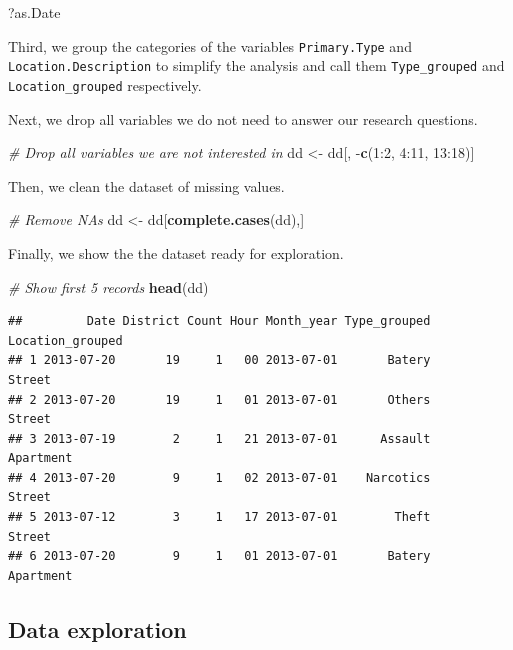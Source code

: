 \documentclass[]{article}
\newenvironment{Shaded}{\begin{snugshade}}{\end{snugshade}}
\newcommand{\KeywordTok}[1]{\textcolor[rgb]{0.13,0.29,0.53}{\textbf{{#1}}}}
\newcommand{\DecValTok}[1]{\textcolor[rgb]{0.00,0.00,0.81}{{#1}}}
\newcommand{\StringTok}[1]{\textcolor[rgb]{0.31,0.60,0.02}{{#1}}}
\newcommand{\CommentTok}[1]{\textcolor[rgb]{0.56,0.35,0.01}{\textit{{#1}}}}
\newcommand{\NormalTok}[1]{{#1}}
\begin{document}
?as.Date

Third, we group the categories of the variables \texttt{Primary.Type}
and \texttt{Location.Description} to simplify the analysis and call them
\texttt{Type\_grouped} and \texttt{Location\_grouped} respectively.

Next, we drop all variables we do not need to answer our research
questions.

\begin{Shaded}
\begin{Highlighting}[]
\CommentTok{# Drop all variables we are not interested in}
\NormalTok{dd <-}\StringTok{ }\NormalTok{dd[, -}\KeywordTok{c}\NormalTok{(}\DecValTok{1}\NormalTok{:}\DecValTok{2}\NormalTok{, }\DecValTok{4}\NormalTok{:}\DecValTok{11}\NormalTok{, }\DecValTok{13}\NormalTok{:}\DecValTok{18}\NormalTok{)]}
\end{Highlighting}
\end{Shaded}

Then, we clean the dataset of missing values.

\begin{Shaded}
\begin{Highlighting}[]
\CommentTok{# Remove NAs}
\NormalTok{dd <-}\StringTok{ }\NormalTok{dd[}\KeywordTok{complete.cases}\NormalTok{(dd),]}
\end{Highlighting}
\end{Shaded}

Finally, we show the the dataset ready for exploration.

\begin{Shaded}
\begin{Highlighting}[]
\CommentTok{# Show first 5 records}
\KeywordTok{head}\NormalTok{(dd)}
\end{Highlighting}
\end{Shaded}

\begin{verbatim}
##         Date District Count Hour Month_year Type_grouped Location_grouped
## 1 2013-07-20       19     1   00 2013-07-01       Batery           Street
## 2 2013-07-20       19     1   01 2013-07-01       Others           Street
## 3 2013-07-19        2     1   21 2013-07-01      Assault        Apartment
## 4 2013-07-20        9     1   02 2013-07-01    Narcotics           Street
## 5 2013-07-12        3     1   17 2013-07-01        Theft           Street
## 6 2013-07-20        9     1   01 2013-07-01       Batery        Apartment
\end{verbatim}

\subsection{Data exploration}\label{data-exploration}
\end{document}
